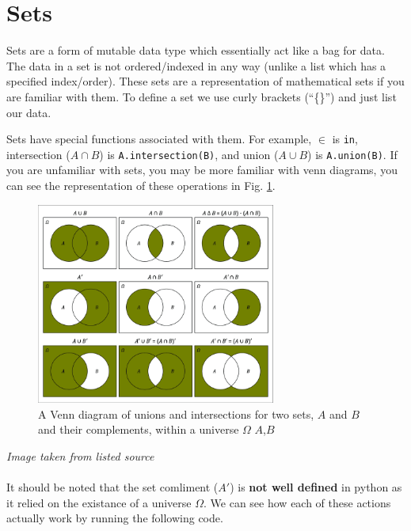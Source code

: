 \documentclass[12pt,a4paper]{book}
\newcommand{\source}[1]{\caption*{Source: {#1}} }
\newcommand{\figref}[1]{Fig. \ref{#1}}
\begin{document}
		\section{Sets}
			Sets are a form of mutable data type which essentially act like a bag for data. The data in a set is not ordered/indexed in any way (unlike a list which has a specified index/order). These sets are a representation of mathematical sets if you are familiar with them. To define a set we use curly brackets (``\{\}'') and just list our data.
			
			
			Sets have special functions associated with them. For example, $\in$ is \texttt{in}, intersection ($A\cap B$) is \texttt{A.intersection(B)}, and union ($A\cup B$) is \texttt{A.union(B)}. If you are unfamiliar with sets, you may be more familiar with venn diagrams, you can see the representation of these operations in \figref{fig:chap5-sets-1}.
			\begin{figure}[H]
				\centering
				\includegraphics[width=0.7\textwidth]{figures/chapter_5/sets.png}
				\caption{A Venn diagram of unions and intersections for two sets, $A$ and $B$ and their complements, within a universe $\Omega$ $A$,$B$}
				\label{fig:chap5-sets-1}
			\end{figure}
			\textit{Image taken from listed source\autocite{chap_5_set_figure_1}} 
			\\\\
			It should be noted that the set comliment ($A'$) is \textbf{not well defined} in python as it relied on the existance of a universe $\Omega$. We can see how each of these actions actually work by running the following code.
\end{document}

